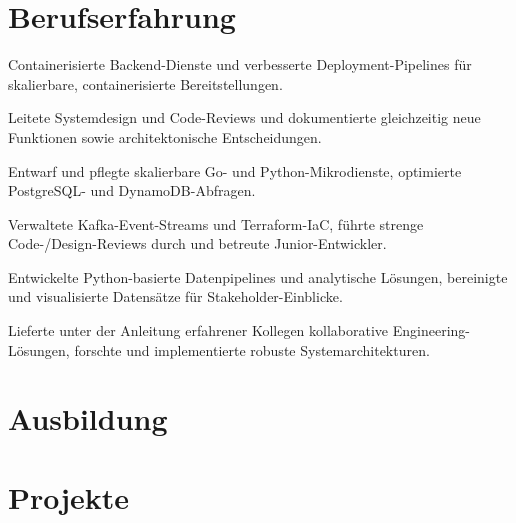 \documentclass[11pt,a4paper]{resume}
\begin{document}
\section{Berufserfahrung}

\bullets
  \item Containerisierte Backend-Dienste und verbesserte Deployment-Pipelines für skalierbare, containerisierte Bereitstellungen.
  \item Leitete Systemdesign und Code-Reviews und dokumentierte gleichzeitig neue Funktionen sowie architektonische Entscheidungen.
\bulletsend
\vspace{3pt}
\bullets
  \item Entwarf und pflegte skalierbare Go- und Python-Mikrodienste, optimierte PostgreSQL- und DynamoDB-Abfragen.
  \item Verwaltete Kafka-Event-Streams und Terraform-IaC, führte strenge Code-/Design-Reviews durch und betreute Junior-Entwickler.
\bulletsend
\vspace{3pt}
\bullets
  \item Entwickelte Python-basierte Datenpipelines und analytische Lösungen, bereinigte und visualisierte Datensätze für Stakeholder-Einblicke.
  \item Lieferte unter der Anleitung erfahrener Kollegen kollaborative Engineering-Lösungen, forschte und implementierte robuste Systemarchitekturen.
\bulletsend
\vspace{3pt}

\section{Ausbildung}

\vspace{2pt}

\section{Projekte}
\end{document}
